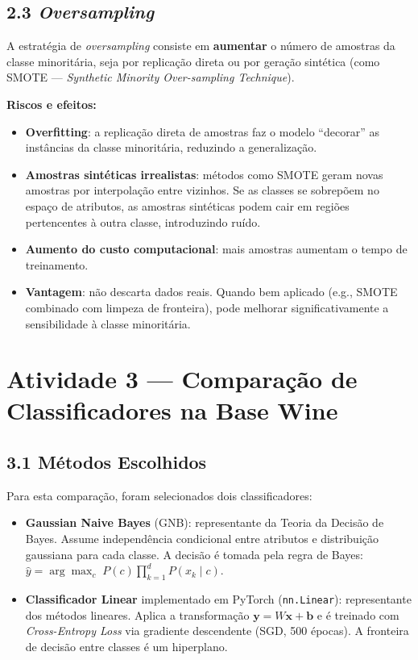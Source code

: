 \documentclass[12pt,a4paper]{article}
\begin{document}
\subsection*{2.3 \textit{Oversampling}}

A estratégia de \textit{oversampling} consiste em \textbf{aumentar} o número de amostras da classe minoritária, seja por replicação direta ou por geração sintética (como SMOTE --- \textit{Synthetic Minority Over-sampling Technique}).

\textbf{Riscos e efeitos:}
\begin{itemize}[nosep]
    \item \textbf{Overfitting}: a replicação direta de amostras faz o modelo ``decorar'' as instâncias da classe minoritária, reduzindo a generalização.
    \item \textbf{Amostras sintéticas irrealistas}: métodos como SMOTE geram novas amostras por interpolação entre vizinhos. Se as classes se sobrepõem no espaço de atributos, as amostras sintéticas podem cair em regiões pertencentes à outra classe, introduzindo ruído.
    \item \textbf{Aumento do custo computacional}: mais amostras aumentam o tempo de treinamento.
    \item \textbf{Vantagem}: não descarta dados reais. Quando bem aplicado (e.g., SMOTE combinado com limpeza de fronteira), pode melhorar significativamente a sensibilidade à classe minoritária.
\end{itemize}


\newpage
\section*{Atividade 3 --- Comparação de Classificadores na Base Wine}

\subsection*{3.1 Métodos Escolhidos}

Para esta comparação, foram selecionados dois classificadores:
\begin{itemize}[nosep]
    \item \textbf{Gaussian Naive Bayes} (GNB): representante da Teoria da Decisão de Bayes. Assume independência condicional entre atributos e distribuição gaussiana para cada classe. A decisão é tomada pela regra de Bayes: $\hat{y} = \arg\max_c \; P(c) \prod_{k=1}^{d} P(x_k \mid c)$.
    \item \textbf{Classificador Linear} implementado em PyTorch (\texttt{nn.Linear}): representante dos métodos lineares. Aplica a transformação $\mathbf{y} = W\mathbf{x} + \mathbf{b}$ e é treinado com \textit{Cross-Entropy Loss} via gradiente descendente (SGD, 500 épocas). A fronteira de decisão entre classes é um hiperplano.
\end{itemize}
\end{document}
